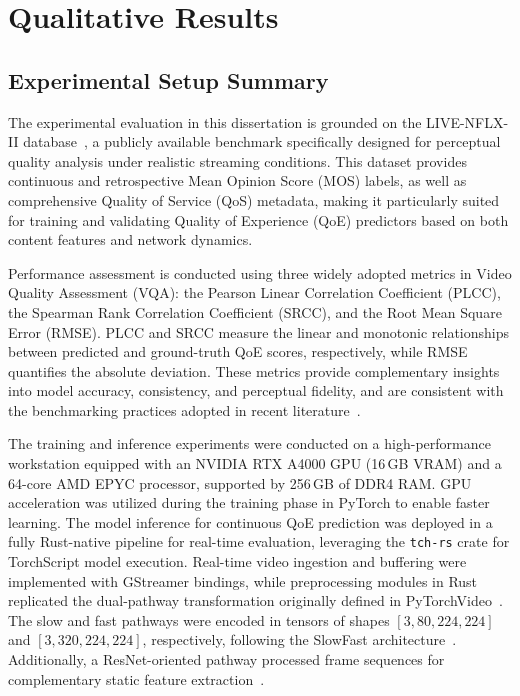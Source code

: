 \chapter{Qualitative Results} \label{chap:ch4}

\section{Experimental Setup Summary}
\label{sec:experimental-setup}

The experimental evaluation in this dissertation is grounded on the LIVE-NFLX-II database~\cite{live_nflx_conf}, a publicly available benchmark specifically designed for perceptual quality analysis under realistic streaming conditions. This dataset provides continuous and retrospective Mean Opinion Score (MOS) labels, as well as comprehensive Quality of Service (QoS) metadata, making it particularly suited for training and validating Quality of Experience (QoE) predictors based on both content features and network dynamics.

Performance assessment is conducted using three widely adopted metrics in Video Quality Assessment (VQA): the Pearson Linear Correlation Coefficient (PLCC), the Spearman Rank Correlation Coefficient (SRCC), and the Root Mean Square Error (RMSE). PLCC and SRCC measure the linear and monotonic relationships between predicted and ground-truth QoE scores, respectively, while RMSE quantifies the absolute deviation. These metrics provide complementary insights into model accuracy, consistency, and perceptual fidelity, and are consistent with the benchmarking practices adopted in recent literature~\cite{jia2024continuous,wu2022fastvqa,li2023unified}.

The training and inference experiments were conducted on a high-performance workstation equipped with an NVIDIA RTX A4000 GPU (16\,GB VRAM) and a 64-core AMD EPYC processor, supported by 256\,GB of DDR4 RAM. GPU acceleration was utilized during the training phase in PyTorch to enable faster learning. The model inference for continuous QoE prediction was deployed in a fully Rust-native pipeline for real-time evaluation, leveraging the \texttt{tch-rs} crate for TorchScript model execution. Real-time video ingestion and buffering were implemented with GStreamer bindings, while preprocessing modules in Rust replicated the dual-pathway transformation originally defined in PyTorchVideo~\cite{fan2021pytorchvideodeeplearninglibrary}. The slow and fast pathways were encoded in tensors of shapes $[3,80,224,224]$ and $[3,320,224,224]$, respectively, following the SlowFast architecture~\cite{feichtenhofer2019slowfast}. Additionally, a ResNet-oriented pathway processed frame sequences for complementary static feature extraction~\cite{he2016deep}.

